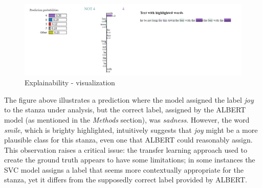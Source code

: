 \begin{figure}[H]
    \centering
    \includegraphics[scale= 0.55]{pictures/expl.png}
    \caption{Explainability - visualization}
    \label{fig:expl}
\end{figure}

The figure above illustrates a prediction where the model assigned the label \textit{joy} to the stanza under analysis, but the correct label, assigned by the ALBERT model (as mentioned in the \textit{Methods} section), was \textit{sadness}.
However, the word \textit{smile}, which is brighty highlighted, intuitively suggests that \textit{joy} might be a more plausible class for this stanza, even one that ALBERT could reasonably assign. 
This observation raises a critical issue: the transfer learning approach used to create the ground truth appears to have some limitations; in some instances the SVC model assigns a label that seems more contextually appropriate for the stanza, 
yet it differs from the supposedly correct label provided by ALBERT.\\

